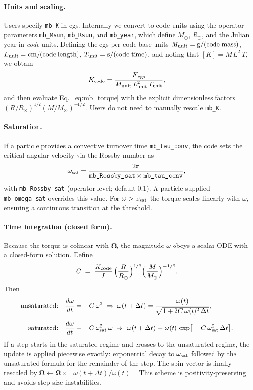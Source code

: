 \documentclass[11pt]{article}
\begin{document}
\paragraph{Units and scaling.}
Users specify \texttt{mb\_K} in cgs. Internally we convert to code units using
the operator parameters \texttt{mb\_Msun}, \texttt{mb\_Rsun}, and
\texttt{mb\_year}, which define $M_\odot$, $R_\odot$, and the Julian year in
\emph{code} units. Defining the cgs-per-code base units
$M_{\rm unit}=\mathrm{g}/\mathrm{(code\;mass)}$,
$L_{\rm unit}=\mathrm{cm}/\mathrm{(code\;length)}$,
$T_{\rm unit}=\mathrm{s}/\mathrm{(code\;time)}$, and noting that
$[K]=M\,L^{2}\,T$, we obtain
\begin{equation}
K_{\rm code}=\frac{K_{\rm cgs}}{M_{\rm unit}\,L_{\rm unit}^{2}\,T_{\rm unit}},
\end{equation}
and then evaluate Eq.~\eqref{eq:mb_torque} with the explicit
dimensionless factors $(R/R_\odot)^{1/2}(M/M_\odot)^{-1/2}$.
Users do not need to manually rescale \texttt{mb\_K}.

\paragraph{Saturation.}
If a particle provides a convective turnover time \texttt{mb\_tau\_conv},
the code sets the critical angular velocity via the Rossby number as
\begin{equation}
\omega_{\rm sat} = \frac{2\pi}{\texttt{mb\_Rossby\_sat}\times \texttt{mb\_tau\_conv}},
\end{equation}
with \texttt{mb\_Rossby\_sat} (operator level; default 0.1).
A particle-supplied \texttt{mb\_omega\_sat} overrides this value.
For $\omega>\omega_{\rm sat}$ the torque scales linearly with $\omega$,
ensuring a continuous transition at the threshold.

\paragraph{Time integration (closed form).}
Because the torque is colinear with $\boldsymbol{\Omega}$,
the magnitude $\omega$ obeys a scalar ODE with a closed-form solution. Define
\begin{equation}
C \;=\; \frac{K_{\rm code}}{I}\,
\Big(\frac{R}{R_\odot}\Big)^{1/2}\Big(\frac{M}{M_\odot}\Big)^{-1/2}.
\end{equation}
Then
\begin{align}
\text{unsaturated:}\quad
&\frac{d\omega}{dt} = -C\,\omega^3
\;\Rightarrow\;
\omega(t+\Delta t) = \frac{\omega(t)}{\sqrt{1+2C\,\omega(t)^2\,\Delta t}},
\\[4pt]
\text{saturated:}\quad
&\frac{d\omega}{dt} = -C\,\omega_{\rm sat}^2\,\omega
\;\Rightarrow\;
\omega(t+\Delta t) = \omega(t)\,\exp\!\big[-C\,\omega_{\rm sat}^2\,\Delta t\big].
\end{align}
If a step starts in the saturated regime and crosses to the unsaturated regime,
the update is applied piecewise exactly: exponential decay to
$\omega_{\rm sat}$ followed by the unsaturated formula for the remainder of the
step. The spin vector is finally rescaled by
$\boldsymbol{\Omega}\leftarrow \boldsymbol{\Omega}\times[\omega(t+\Delta t)/\omega(t)]$.
This scheme is positivity‑preserving and avoids step‑size instabilities.
\end{document}
